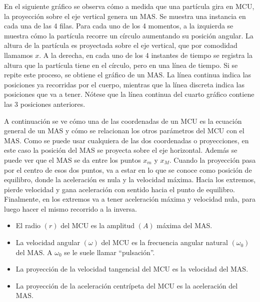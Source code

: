 \documentclass[a5paper,12pt,twoside]{book}
\begin{document}
En el siguiente gráfico se observa cómo a medida que una partícula gira en MCU, la proyección sobre el eje vertical genera un MAS. Se muestra una instancia en cada una de las 4 filas. Para cada uno de los 4 momentos, a la izquierda se muestra cómo la partícula recorre un círculo aumentando su posición angular. La altura de la partícula es proyectada sobre el eje vertical, que por comodidad llamamos $x$. A la derecha, en cada uno de los 4 instantes de tiempo se registra la altura que la partícula tiene en el círculo, pero en una línea de tiempo. Si se repite este proceso, se obtiene el gráfico de un MAS. La línea continua indica las posiciones ya recorridas por el cuerpo, mientras que la línea discreta indica las posiciones que va a tener. Nótese que la línea continua del cuarto gráfico contiene las 3 posiciones anteriores.

\begin{center}
    \def\svgwidth{\linewidth}
    
\end{center}

A continuación se ve cómo una de las coordenadas de un MCU es la ecuación general de un MAS y cómo se relacionan los otros parámetros del MCU con el MAS. Como se puede usar cualquiera de las dos coordenadas o proyecciones, en este caso la posición del MAS se proyecta sobre el eje horizontal. Además se puede ver que el MAS se da entre los puntos $x_m$ y $x_M$. Cuando la proyección pasa por el centro de esos dos puntos, va a estar en lo que se conoce como posición de equilibro, donde la aceleración es nula y la velocidad máxima. Hacia los extremos, pierde velocidad y gana aceleración con sentido hacia el punto de equilibro. Finalmente, en los extremos va a tener aceleración máxima y velocidad nula, para luego hacer el mismo recorrido a la inversa.

\begin{center}
    \vspace{-2cm}
    \def\svgwidth{\linewidth}
    
    \vspace{-2cm}
\end{center}

\begin{itemize}
    \item El radio $(r)$ del MCU es la amplitud $(A)$ máxima del MAS.
    \item La velocidad angular $(\omega)$ del MCU es la frecuencia angular natural $(\omega_0)$ del MAS.
    A $\omega_0$ se le suele llamar ``pulsación''.
    \item La proyección de la velocidad tangencial del MCU es la velocidad del MAS.
    \item La proyección de la aceleración centrípeta del MCU es la aceleración del MAS.
\end{itemize}
\end{document}
